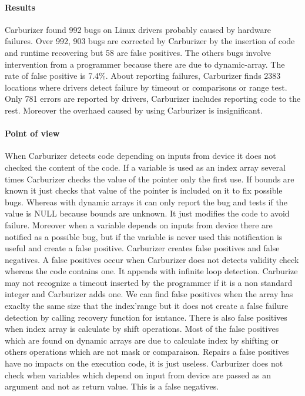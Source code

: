 \documentclass[10pt]{article}
\begin{document}
\paragraph{Results}
Carburizer found 992 bugs on Linux drivers probably caused by hardware failures. Over 992, 903 bugs are corrected by Carburizer by the insertion of code and runtime recovering but 58 are false positives. The others bugs involve intervention from a programmer because there are due to dynamic-array. The rate of false positive is 7.4\%.
About reporting failures, Carburizer finds 2383 locations where drivers detect failure by timeout or comparisons or range test. Only 781 errors are reported by drivers, Carburizer includes reporting code to the rest.
Moreover the overhaed caused by using Carburizer is insignificant.


\paragraph{Point of view}
When Carburizer detects code depending on inputs from device it does not checked the content of the code. If a variable is used as an index array several times Carburizer checks the value of the pointer only the first use. If bounds are known it just checks that value of the pointer is included on it to fix possible bugs. Whereas with dynamic arrays it can only report the bug and tests if the value is NULL because bounds are unknown. It just modifies the code to avoid failure. Moreover when a variable depends on inputs from device there are notified as a possible bug, but if the variable is never used this notification is useful and create a false positive.
Carburizer creates false positives and false negatives. 
A false positives occur when Carburizer does not detects validity check whereas the code contains one. It appends with infinite loop detection. Carburize may not recognize a timeout inserted by the programmer if it is a non standard integer and Carburizer adds one. We can find false positives when the array has exaclty the same size that the index'range but it does not create a false failure detection by calling recovery function for isntance. There is also false positives when index array is calculate by shift operations. Most of the false positives which are found on dynamic arrays are due to calculate index by shifting or others operations which are not mask or comparaison.
Repairs a false positives have no impacts on the execution code, it is just useless.
Carburizer does not check when variables which depend on input from device are passed as an argument and not as return value. This is a false negatives. 
\end{document}
